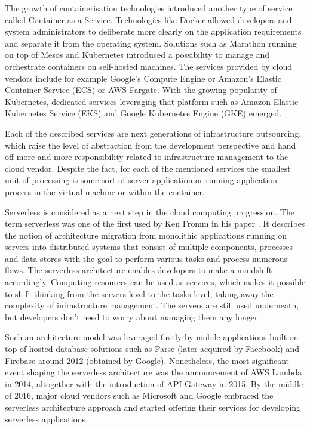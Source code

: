 The growth of containerisation technologies introduced another type of service called Container as a Service. Technologies like Docker allowed developers and system administrators to deliberate more clearly on the application requirements and separate it from the operating system. Solutions such as Marathon running on top of Mesos and Kubernetes introduced a possibility to manage and orchestrate containers on self-hosted machines. The services provided by cloud vendors include for example Google's Compute Engine or Amazon's Elastic Container Service (ECS) or AWS Fargate. With the growing popularity of Kubernetes, dedicated services leveraging that platform such as Amazon Elastic Kubernetes Service (EKS) and Google Kubernetes Engine (GKE) emerged.

Each of the described services are next generations of infrastructure outsourcing, which raise the level of abstraction from the development perspective and hand off more and more responsibility related to infrastructure management to the cloud vendor. Despite the fact, for each of the mentioned services the smallest unit of processing is some sort of server application or running application process in the virtual machine or within the container.

Serverless is considered as a next step in the cloud computing progression. The term serverless was one of the first used by Ken Fromm in his paper \cite{KenFromm}. It describes the notion of architecture migration from monolithic applications running on servers into distributed systems that consist of multiple components, processes and data stores with the goal to perform various tasks and process numerous flows. The serverless architecture enables developers to make a mindshift accordingly. Computing resources can be used as services, which makes it possible to shift thinking from the servers level to the tasks level, taking away the complexity of infrastructure management. The servers are still used underneath, but developers don't need to worry about managing them any longer.

Such an architecture model was leveraged firstly by mobile applications built on top of hosted database solutions such as Parse (later acquired by Facebook) and Firebase around 2012 (obtained by Google). Nonetheless, the most significant event shaping the serverless architecture was the announcement of AWS Lambda in 2014, altogether with the introduction of API Gateway in 2015. By the middle of 2016, major cloud vendors such as Microsoft and Google embraced the serverless architecture approach and started offering their services for developing serverless applications.

